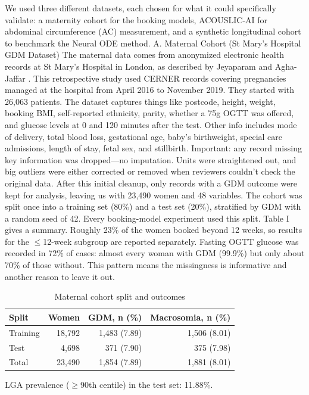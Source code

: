 \documentclass[conference]{IEEEtran}
\begin{document}
We used three different datasets, each chosen for what it could specifically validate: a maternity cohort for the booking models, ACOUSLIC-AI for abdominal circumference (AC) measurement, and a synthetic longitudinal cohort to benchmark the Neural ODE method. A. Maternal Cohort (St Mary's Hospital GDM Dataset) The maternal data comes from anonymized electronic health records at St Mary's Hospital in London, as described by Jeyaparam and Agha-Jaffar \cite{r41}. This retrospective study used CERNER records covering pregnancies managed at the hospital from April 2016 to November 2019. They started with 26,063 patients. The dataset captures things like postcode, height, weight, booking BMI, self-reported ethnicity, parity, whether a 75g OGTT was offered, and glucose levels at 0 and 120 minutes after the test. Other info includes mode of delivery, total blood loss, gestational age, baby's birthweight, special care admissions, length of stay, fetal sex, and stillbirth. Important: any record missing key information was dropped---no imputation. Units were straightened out, and big outliers were either corrected or removed when reviewers couldn't check the original data. After this initial cleanup, only records with a GDM outcome were kept for analysis, leaving us with 23,490 women and 48 variables. The cohort was split once into a training set (80\%) and a test set (20\%), stratified by GDM with a random seed of 42. Every booking-model experiment used this split. Table I gives a summary. Roughly 23\% of the women booked beyond 12 weeks, so results for the \ensuremath{\leq}12-week subgroup are reported separately. Fasting OGTT glucose was recorded in 72\% of cases: almost every woman with GDM (99.9\%) but only about 70\% of those without. This pattern means the missingness is informative and another reason to leave it out.



\begin{table}[!t]
\centering
\caption{Maternal cohort split and outcomes}\label{tab:1}
\footnotesize
\setlength{\tabcolsep}{2.5pt}
\begin{tabular}{lrrr}
\toprule
\textbf{Split} & \textbf{Women} & \textbf{GDM, n (\%)} & \textbf{Macrosomia, n (\%)} \\
\midrule
Training & 18,792 & 1,483 (7.89) & 1,506 (8.01) \\
Test & 4,698 & 371 (7.90) & 375 (7.98) \\
Total & 23,490 & 1,854 (7.89) & 1,881 (8.01) \\
\bottomrule
\end{tabular}
\vspace{2pt}
\par\footnotesize LGA prevalence (\ensuremath{\geq}90th centile) in the test set: 11.88\%.
\end{table}
\end{document}
